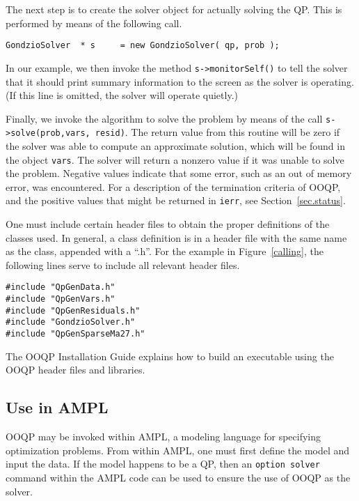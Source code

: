 The next step is to create the solver object for actually solving the
QP. This is performed by means of the following call.
\begin{verbatim}
GondzioSolver  * s     = new GondzioSolver( qp, prob );
\end{verbatim}
In our example, we then invoke the method \texttt{s->monitorSelf()}
to tell the solver that it should print summary information to the
screen as the solver is operating.  (If this line is omitted, the
solver will operate quietly.)  

Finally, we invoke the algorithm to solve
the problem by means of the call  {\tt s->solve(prob,vars, resid)}.
The return value from this routine will be zero if the solver was able
to compute an approximate solution, which will be found in the object
\texttt{vars}. The solver will return a nonzero value if it was unable
to solve the problem. Negative values indicate that some error, such
as an out of memory error, was encountered. For a description of the
termination criteria of OOQP, and the positive values that might be
returned in \texttt{ierr}, see Section~\ref{sec.status}.

One must include certain header files to obtain the proper definitions
of the classes used. In general, a class definition is in a header
file with the same name as the class, appended with a ``.h''. For the
example in Figure~\ref{calling}, the following lines serve to include
all relevant header files.
\begin{verbatim}
#include "QpGenData.h"
#include "QpGenVars.h"
#include "QpGenResiduals.h"
#include "GondzioSolver.h"
#include "QpGenSparseMa27.h"
\end{verbatim}
The OOQP Installation Guide explains how to build an executable using
the OOQP header files and libraries.

\subsection{Use in AMPL}
\label{sec.use-in-ampl}

OOQP may be invoked within AMPL, a modeling language for specifying
optimization problems.  From within AMPL, one must first define the
model and input the data. If the model happens to be a QP, then an
{\tt option solver} command within the AMPL code can be used to ensure
the use of OOQP as the solver.

